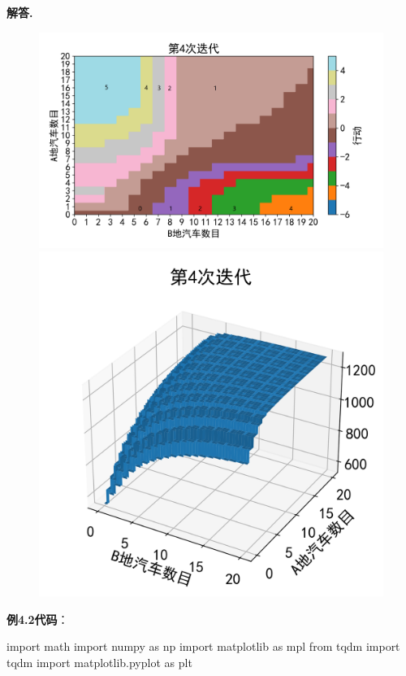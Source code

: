 \documentclass[12pt, a4paper, oneside]{ctexart}
\newenvironment{solution}[1][]{\par\noindent\textbf{#1解答. }}{\smallskip\par}  %
\begin{document}
\begin{solution}
\begin{figure}[htbp]
        \subfigure  %
        {
            \begin{minipage}[b]{.62\linewidth}
                \centering
                \includegraphics[scale=0.22]{080/080页练习4.7policy4.png}
            \end{minipage}
        }
        \subfigure
        {
            \begin{minipage}[b]{.2\linewidth}
                \centering
                \includegraphics[scale=0.52]{080/080页练习4.7value4.png}
            \end{minipage}
        }
    \end{figure}
    \textbf{例4.2代码}：
    \begin{pythoncode}
import math
import numpy as np
import matplotlib as mpl
from tqdm import tqdm
import matplotlib.pyplot as plt


\end{pythoncode}
\end{solution}
\end{document}
